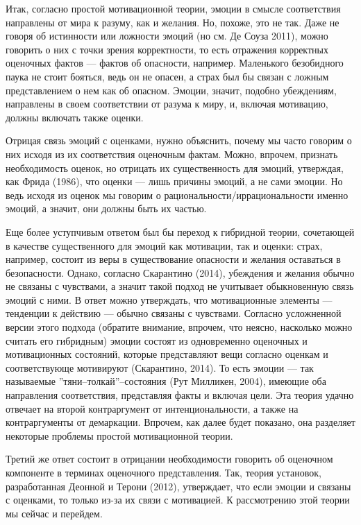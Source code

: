 \documentclass[11pt]{book}
\begin{document}
Итак, согласно простой мотивационной теории, эмоции в смысле соответствия направлены от мира к разуму, как и желания. Но, похоже, это не так. Даже не говоря об истинности или ложности эмоций (но см. Де Соуза 2011), можно говорить о них с точки зрения корректности, то есть отражения корректных оценочных фактов --- фактов об опасности, например. Маленького безобидного паука не стоит бояться, ведь он не опасен, а страх был бы связан с ложным представлением о нем как об опасном. Эмоции, значит, подобно убеждениям, направлены в своем соответствии от разума к миру, и, включая мотивацию, должны включать также оценки.

Отрицая связь эмоций с оценками, нужно объяснить, почему мы часто говорим о них исходя из их соответствия оценочным фактам. Можно, впрочем, признать необходимость оценок, но отрицать их существенность для эмоций, утверждая, как Фрида (1986), что оценки --- лишь причины эмоций, а не сами эмоции. Но ведь исходя из оценок мы говорим о рациональности/иррациональности именно эмоций, а значит, они должны быть их частью.

Еще более уступчивым ответом был бы переход к гибридной теории, сочетающей в качестве существенного для эмоций как мотивации, так и оценки: страх, например, состоит из веры в существование опасности и желания оставаться в безопасности. Однако, согласно Скарантино (2014), убеждения и желания обычно не связаны с чувствами, а значит такой подход не учитывает обыкновенную связь эмоций с ними. В ответ можно утверждать, что мотивационные элементы --- тенденции к действию --- обычно связаны с чувствами. Согласно усложненной версии этого подхода (обратите внимание, впрочем, что неясно, насколько можно считать его гибридным) эмоции состоят из одновременно оценочных и мотивационных состояний, которые представляют вещи согласно оценкам и соответствующе мотивируют (Скарантино, 2014). То есть эмоции --- так называемые ''тяни--толкай''--состояния (Рут Милликен, 2004), имеющие оба направления соответствия, представляя факты и включая цели. Эта теория удачно отвечает на второй контраргумент от интенциональности, а также на контраргументы от демаркации. Впрочем, как далее будет показано, она разделяет некоторые проблемы простой мотивационной теории.

Третий же ответ состоит в отрицании необходимости говорить об оценочном компоненте в терминах оценочного представления. Так, теория установок, разработанная Деонной и Терони (2012), утверждает, что если эмоции и связаны с оценками, то только из-за их связи с мотивацией. К рассмотрению этой теории мы сейчас и перейдем.
\end{document}
